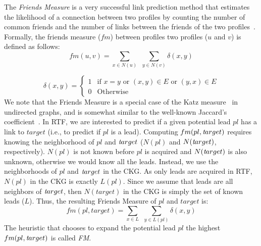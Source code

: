 \documentclass[journal]{IEEEtran}
\newcommand{\target}{{\textit target}}
\begin{document}
The \emph{Friends Measure} is a very successful link prediction method that estimates the likelihood of a connection between two profiles by counting the number of common friends and the number of links between the friends of the two profiles~\cite{fire2013linkPrediction}.
Formally, the friends measure ($fm$) between profiles two profiles ($u$ and $v$) is defined as follows:
\begin{equation}
fm(u,v)= \sum\limits_{x\in N(u)}~~\sum\limits_{y \in N(v)} \delta(x,y)
\end{equation}

\begin{equation}
\delta(x,y) = \begin{cases}
1 &\text{if $x=y$ or $(x,y)\in E$ or $(y,x) \in E$}\\
0 &\text{Otherwise}
\end{cases}
\end{equation}
We note that the Friends Measure is a special case of the Katz measure~\cite{katz1953aNewStatus} in undirected graphs, and is somewhat similar to the well-known Jaccard's coefficient~\cite{fire2014computationallyEfficient}. 
In RTF, we are interested to predict if a given potential lead $pl$ has a link to $target$ (i.e., to predict if $pl$ is a lead). Computing $fm(pl,\target)$ requires knowing the neighborhood of $pl$ and $\target$ ($N(pl)$ and $N(\target)$, respectively). $N(pl)$ is not known before $pl$ is acquired and $N(\target)$ is also unknown, otherwise we would know all the leads. Instead, we use the neighborhoods of $pl$ and $\target$ in the CKG. As only leads are acquired in RTF, $N(pl)$ in the CKG is exactly $L(pl)$. Since we assume that leads are all neighbors of $\target$, then $N(target)$ in the CKG is simply the set of known leads ($L$). Thus, the resulting Friends Measure of $pl$ and $target$ is:
\begin{equation}
fm(pl,target)= \sum\limits_{x\in L}~~\sum\limits_{y\in L(pl)  } \delta(x,y)
\end{equation}
\noindent The heuristic that chooses to expand the potential lead $pl$ the highest $fm(pl,\target)$ is called {\em FM}. 
\end{document}
